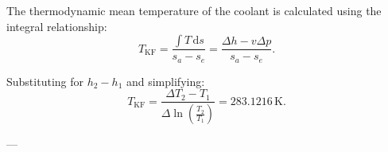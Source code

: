 The thermodynamic mean temperature of the coolant is calculated using the integral relationship:  
\[
T_{\text{KF}} = \frac{\int T \, \text{d}s}{s_a - s_e} = \frac{\Delta h - v \Delta p}{s_a - s_e}.
\]  

Substituting for \( h_2 - h_1 \) and simplifying:  
\[
T_{\text{KF}} = \frac{\Delta T_2 - T_1}{\Delta \ln \left( \frac{T_2}{T_1} \right)} = 283.1216 \, \text{K}.
\]  

---